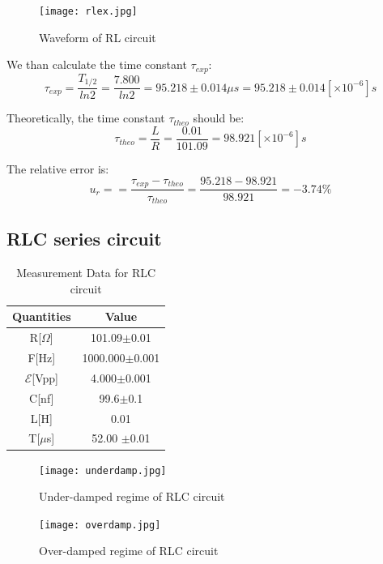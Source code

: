 \documentclass[12pt,a4paper]{article}
\begin{document}
\begin{figure}[H]
    \centering
    \texttt{[image: rlex.jpg]}
    \caption{Waveform of RL circuit}
\end{figure}

We than calculate the time constant $\tau_{exp}$:
$$\tau_{exp}=\frac{T_{1/2}}{ln2}=\frac{7.800}{ln2}=95.218\pm0.014\mu s=95.218\pm0.014 [\times 10^{-6}]s$$

Theoretically, the time constant ${\tau}_{theo}$ should be:
$${\tau}_{theo}=\frac{L}{R}=\frac{0.01}{101.09}=98.921 [\times 10^{-6}]s$$

The relative error is:
$$u_r==\frac{\tau_{exp}-\tau_{theo}}{\tau_{theo}}=\frac{95.218-98.921}{98.921}=-3.74\%$$

\subsection{RLC series circuit}
\begin{table}[H]
    \centering
    \begin{tabular}{|c|c|}
    \hline
    Quantities             & Value              \\ \hline
    R{[}$\Omega${]}        & 101.09$\pm$0.01    \\ \hline
    F{[}Hz{]}              & 1000.000$\pm$0.001 \\ \hline
    $\mathcal{E}${[}Vpp{]} & 4.000$\pm$0.001    \\ \hline
    C{[}nf{]}              & 99.6$\pm$0.1       \\ \hline
    L{[}H{]}              & 0.01       \\ \hline
    T{[}$\mu$s{]}          & 52.00 $\pm$0.01    \\ \hline
    \end{tabular}
    \caption{Measurement Data for RLC circuit}
\end{table}

\begin{figure}[H]
    \begin{minipage}{0.49\linewidth}
        \centering
        \texttt{[image: underdamp.jpg]}
        \caption{Under-damped regime of RLC circuit}
    \end{minipage}  
    \begin{minipage}{0.49\linewidth}
        \centering
        \texttt{[image: overdamp.jpg]}
        \caption{Over-damped regime of RLC circuit}
    \end{minipage} 
\end{figure}
\end{document}
